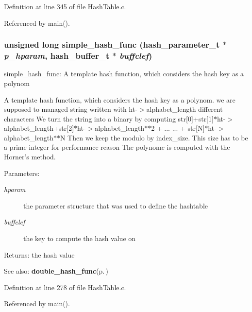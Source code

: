 Definition at line 345 of file Hash\-Table.c.

Referenced by main().
\subsubsection{\setlength{\rightskip}{0pt plus 5cm}unsigned long simple\_\-hash\_\-func (hash\_\-parameter\_\-t $\ast$ {\em p\_\-hparam}, hash\_\-buffer\_\-t $\ast$ {\em buffclef})}\label{group__HashTableInternalFunctions_ga0}


simple\_\-hash\_\-func: A template hash function, which considers the hash key as a polynom

A template hash function, which considers the hash key as a polynom. we are supposed to managed string written with ht-$>$alphabet\_\-length different characters We turn the string into a binary by computing str[0]+str[1]$\ast$ht-$>$alphabet\_\-length+str[2]$\ast$ht-$>$alphabet\_\-length$\ast$$\ast$2 + ... ... + str[N]$\ast$ht-$>$alphabet\_\-length$\ast$$\ast$N Then we keep the modulo by index\_\-size. This size has to be a prime integer for performance reason The polynome is computed with the Horner's method.

\begin{Desc}
\item[Parameters:]
\begin{description}
\item[{\em hparam}]the parameter structure that was used to define the hashtable \item[{\em buffclef}]the key to compute the hash value on\end{description}
\end{Desc}
\begin{Desc}
\item[Returns:]the hash value\end{Desc}
\begin{Desc}
\item[See also:]{\bf double\_\-hash\_\-func}{\rm (p.\,\pageref{group__HashTableInternalFunctions_ga1})} \end{Desc}


Definition at line 278 of file Hash\-Table.c.

Referenced by main().